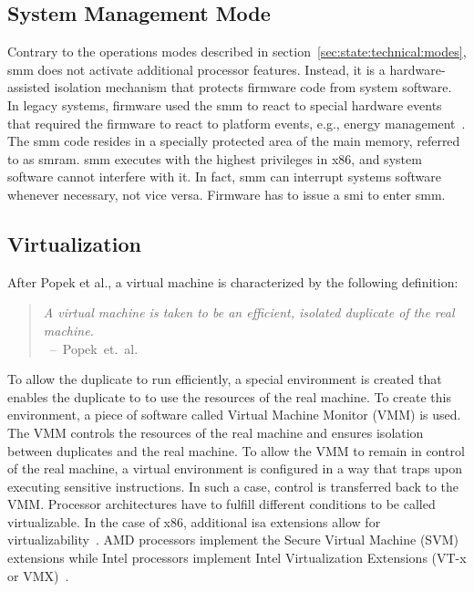 \subsection{System Management Mode}
\label{sec:state:technical:smm}
Contrary to the operations modes described in
section~\ref{sec:state:technical:modes}, \gls{smm} does not activate additional
processor features. Instead, it is a hardware-assisted isolation mechanism that
protects firmware code from system software. In legacy systems, firmware used
the \gls{smm} to react to special hardware events that required the firmware to
react to platform events, e.g., energy management~\cite{intel_sdm}. The
\gls{smm} code resides in a specially protected area of the main memory,
referred to as \gls{smram}. \gls{smm} executes with the highest privileges in
x86, and system software cannot interfere with it. In fact, \gls{smm} can
interrupt systems software whenever necessary, not vice versa. Firmware has to
issue a \gls{smi} to enter \gls{smm}.

\subsection{Virtualization}
\label{sec:state:technical:virt}
After Popek et al., a virtual machine is characterized by the following
definition:
\begin{quote}
  \textit{ A virtual machine is taken to be an efficient, isolated duplicate of
    the real machine. \\
  } \mbox{ -- Popek et. al. ~\cite{popek1974formal}}
\end{quote}
To allow the duplicate to run efficiently, a special environment is created that
enables the duplicate to to use the resources of the real machine. To create this
environment, a piece of software called Virtual Machine Monitor (VMM) is used.
The VMM controls the resources of the real machine and ensures isolation between
duplicates and the real machine. To allow the VMM to remain in control of the
real machine, a virtual environment is configured in a way that traps upon
executing sensitive instructions. In such a case, control is transferred back to
the VMM. Processor architectures have to fulfill different conditions to be
called virtualizable. In the case of x86, additional \gls{isa} extensions
allow for virtualizability~\cite {adams2006comparison}. AMD processors
implement the Secure Virtual Machine (SVM) extensions while Intel processors
implement Intel Virtualization Extensions (VT-x or VMX)~\cite{amd_manual,
intel_sdm}.

